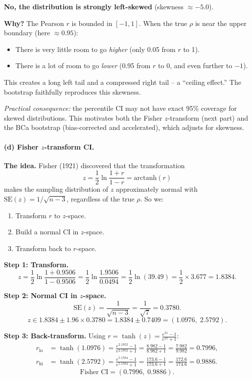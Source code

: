 \documentclass[11pt]{article}
\begin{document}
\textbf{No, the distribution is strongly left-skewed} (skewness $\approx -5.0$).

\textbf{Why?} The Pearson $r$ is bounded in $[-1, 1]$. When the true $\rho$ is near the upper boundary (here $\approx 0.95$):
\begin{itemize}
  \item There is very little room to go \textit{higher} (only 0.05 from $r$ to 1).
  \item There is a lot of room to go \textit{lower} (0.95 from $r$ to 0, and even further to $-1$).
\end{itemize}
This creates a long left tail and a compressed right tail -- a ``ceiling effect.'' The bootstrap faithfully reproduces this skewness.

\textit{Practical consequence:} the percentile CI may not have exact 95\% coverage for skewed distributions. This motivates both the Fisher $z$-transform (next part) and the BCa bootstrap (bias-corrected and accelerated), which adjusts for skewness.

\paragraph{(d) Fisher $z$-transform CI.}

\textbf{The idea.} Fisher (1921) discovered that the transformation
\[
  z = \frac{1}{2} \ln\frac{1+r}{1-r} = \text{arctanh}(r)
\]
makes the sampling distribution of $z$ approximately normal with $\text{SE}(z) = 1/\sqrt{n-3}$, regardless of the true $\rho$. So we:
\begin{enumerate}
  \item Transform $r$ to $z$-space.
  \item Build a normal CI in $z$-space.
  \item Transform back to $r$-space.
\end{enumerate}

\textbf{Step 1: Transform.}
\[
  z = \frac{1}{2}\ln\frac{1 + 0.9506}{1 - 0.9506}
  = \frac{1}{2}\ln\frac{1.9506}{0.0494}
  = \frac{1}{2}\ln(39.49)
  = \frac{1}{2} \times 3.677
  = 1.8384.
\]

\textbf{Step 2: Normal CI in $z$-space.}
\[
  \text{SE}(z) = \frac{1}{\sqrt{n - 3}} = \frac{1}{\sqrt{7}} = 0.3780.
\]
\[
  z \in 1.8384 \pm 1.96 \times 0.3780 = 1.8384 \pm 0.7409 = (1.0976,\; 2.5792).
\]

\textbf{Step 3: Back-transform.} Using $r = \tanh(z) = \frac{e^{2z} - 1}{e^{2z} + 1}$:
\begin{align*}
  r_{\text{lo}} &= \tanh(1.0976) = \frac{e^{2.1952} - 1}{e^{2.1952} + 1} = \frac{8.982 - 1}{8.982 + 1} = \frac{7.982}{9.982} = 0.7996, \\[4pt]
  r_{\text{hi}} &= \tanh(2.5792) = \frac{e^{5.1584} - 1}{e^{5.1584} + 1} = \frac{173.6 - 1}{173.6 + 1} = \frac{172.6}{174.6} = 0.9886.
\end{align*}
\[
  \boxed{\text{Fisher CI} = (0.7996,\; 0.9886)}.
\]
\end{document}
